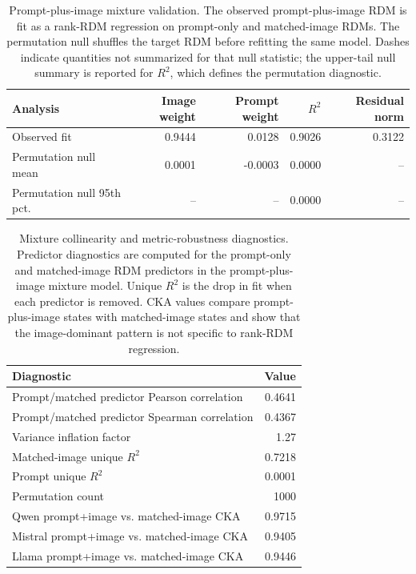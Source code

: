 \documentclass{article}
\begin{document}
\begin{table}[!htbp]
\centering
\caption{Prompt-plus-image mixture validation. The observed prompt-plus-image RDM is fit as a rank-RDM regression on prompt-only and matched-image RDMs. The permutation null shuffles the target RDM before refitting the same model. Dashes indicate quantities not summarized for that null statistic; the upper-tail null summary is reported for \(R^2\), which defines the permutation diagnostic.}
\label{tab:appendix_mixture_validation}
\small
\begin{tabular}{lrrrr}
\toprule
Analysis & Image weight & Prompt weight & \(R^2\) & Residual norm \\
\midrule
Observed fit & 0.9444 & 0.0128 & 0.9026 & 0.3122 \\
Permutation null mean & 0.0001 & -0.0003 & 0.0000 & -- \\
Permutation null 95th pct. & -- & -- & 0.0000 & -- \\
\bottomrule
\end{tabular}
\end{table}

\begin{table}[!htbp]
\centering
\caption{Mixture collinearity and metric-robustness diagnostics. Predictor diagnostics are computed for the prompt-only and matched-image RDM predictors in the prompt-plus-image mixture model. Unique \(R^2\) is the drop in fit when each predictor is removed. CKA values compare prompt-plus-image states with matched-image states and show that the image-dominant pattern is not specific to rank-RDM regression.}
\label{tab:appendix_mixture_collinearity}
\small
\begin{tabular}{lr}
\toprule
Diagnostic & Value \\
\midrule
Prompt/matched predictor Pearson correlation & 0.4641 \\
Prompt/matched predictor Spearman correlation & 0.4367 \\
Variance inflation factor & 1.27 \\
Matched-image unique \(R^2\) & 0.7218 \\
Prompt unique \(R^2\) & 0.0001 \\
Permutation count & 1000 \\
\midrule
Qwen prompt+image vs. matched-image CKA & 0.9715 \\
Mistral prompt+image vs. matched-image CKA & 0.9405 \\
Llama prompt+image vs. matched-image CKA & 0.9446 \\
\bottomrule
\end{tabular}
\end{table}
\end{document}
